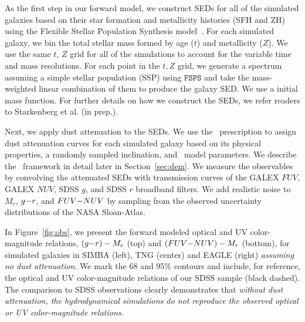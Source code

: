 As the first step in our forward model, we construct SEDs for all
of the simulated galaxies based on their star formation and metallicity
histories (SFH and ZH) using the Flexible Stellar Population Synthesis
model~\citep[$\mathtt{FSPS}$;][]{conroy2009, conroy2010}. For each simulated
galaxy, we bin the total stellar mass formed by age ($t$) and metallicity
($Z$). We use the same $t$, $Z$ grid for all of the simulations
to account for the variable time and mass resolutions. For each point in the
$t, Z$ grid, we generate a spectrum assuming a simple stellar population (SSP)
using $\mathtt{FSPS}$ and take the mass-weighted linear combination of them to
produce the galaxy SED. We use a
\cite{chabrier2003} initial mass function. For further details on how we
construct the SEDs, we refer readers to Starkenberg et al. (in prep.).

Next, we apply dust attenuation to the SEDs. We use the \eda~prescription
to assign dust attenuation curves for each simulated galaxy based on its physical
properties, a randomly sampled inclination, and \eda~model parameters. We
describe the \eda~framework in detail later in Section~\ref{sec:dem}. We
measure the observables by convolving the attenuated SEDs with transmission
curves of the GALEX $FUV$, GALEX $NUV$, SDSS $g$, and SDSS $r$ broadband
filters. We add realistic noise to $M_r$, $g{-}r$, and $FUV{-}NUV$ by sampling
from the observed uncertainty distributions of the NASA Sloan-Atlas.

In Figure~\ref{fig:obs}, we present the forward modeled optical and UV
color-magnitude relations, $(g{-}r)-M_r$ (top) and $(FUV{-}NUV)-M_r$ (bottom),
for simulated galaxies in SIMBA (left), TNG (center) and EAGLE (right)
\emph{assuming no dust attenuation}. We mark the 68 and 95\% contours and
include, for reference, the optical and UV color-magnitude relations of our
SDSS sample (black dashed). 
The comparison to SDSS observations clearly demonstrates
that {\em without dust attenuation, the hydrodynamical simulations do not
reproduce the observed optical or UV color-magnitude relations.}


